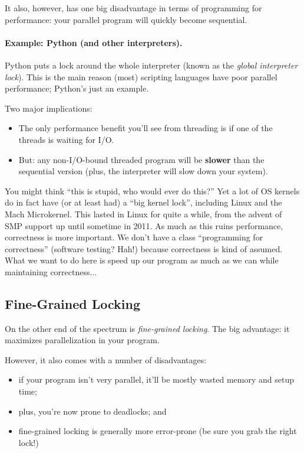 It also, however, has one big disadvantage in terms of programming for performance: your parallel program will quickly become sequential.

\paragraph{Example: Python (and other interpreters).}
Python puts a lock around the whole interpreter (known as the
\emph{global interpreter lock}).  This is the main reason (most)
scripting languages have poor parallel performance; Python's just an
example.

Two major implications:
\begin{itemize}
\item The only performance benefit you'll see from threading is if one of the threads is
      waiting for I/O.
\item But: any non-I/O-bound threaded program will be {\bf slower} than the sequential
      version (plus, the interpreter will slow down your system).
\end{itemize}

You might think ``this is stupid, who would ever do this?'' Yet a lot of OS kernels do in fact have (or at least had) a ``big kernel lock'', including Linux and the Mach Microkernel. This lasted in Linux for quite a while, from the advent of SMP support up until sometime in 2011. As much as this ruins performance, correctness is more important. We don't have a class ``programming for correctness'' (software testing? Hah!) because correctness is kind of assumed. What we want to do here is speed up our program as much as we can while maintaining correctness...

\subsection*{Fine-Grained Locking}
On the other end of the spectrum is \emph{fine-grained locking}. The big
advantage: it maximizes parallelization in your program.

However, it also comes with a number of disadvantages:
  \begin{itemize}
    \item if your program isn't very parallel, it'll be mostly wasted memory and setup time;
    \item plus, you're now prone to deadlocks; and
    \item fine-grained locking is generally more error-prone (be sure you grab the right lock!)
  \end{itemize}

